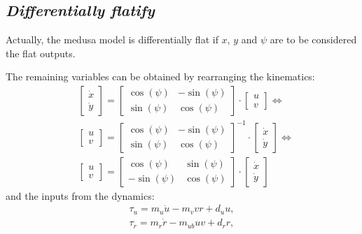 \subsection{\textit{Differentially flatify}}

\par Actually, the medusa model is differentially flat if $x$, $y$ and $\psi$ are to be considered the flat outputs.

The remaining variables can be obtained by rearranging the kinematics:
\begin{equation}
\begin{split}
    & \begin{bmatrix}
        \dot{x} \\ \dot{y}
    \end{bmatrix} = 
    \begin{bmatrix}
        \cos(\psi) & - \sin(\psi) \\
        \sin(\psi) & \cos(\psi)
    \end{bmatrix} \cdot
    \begin{bmatrix}
        u \\ v
    \end{bmatrix} \Leftrightarrow  \\
    & \begin{bmatrix}
        u \\ v
    \end{bmatrix} = 
    \begin{bmatrix}
        \cos(\psi) & - \sin(\psi) \\
        \sin(\psi) & \cos(\psi)
    \end{bmatrix}^{-1} \cdot
    \begin{bmatrix}
        \dot{x} \\ \dot{y}
    \end{bmatrix} \Leftrightarrow \\
    & \begin{bmatrix}
        u \\ v
    \end{bmatrix} = 
    \begin{bmatrix}
        \cos(\psi) & \sin(\psi) \\
        - \sin(\psi) & \cos(\psi)
    \end{bmatrix} \cdot
    \begin{bmatrix}
        \dot{x} \\ \dot{y}
    \end{bmatrix}
\end{split}
\end{equation}
and the  inputs from the dynamics:
\begin{equation} 
    \begin{gathered}
        \tau_u = m_u\dot{u} - m_v v r + d_u u , \\
        \tau_r = m_r \dot{r} - m_{ub} u v + d_r r ,
    \end{gathered}
    \label{eq:rearaged_dynamics}
\end{equation}
 

